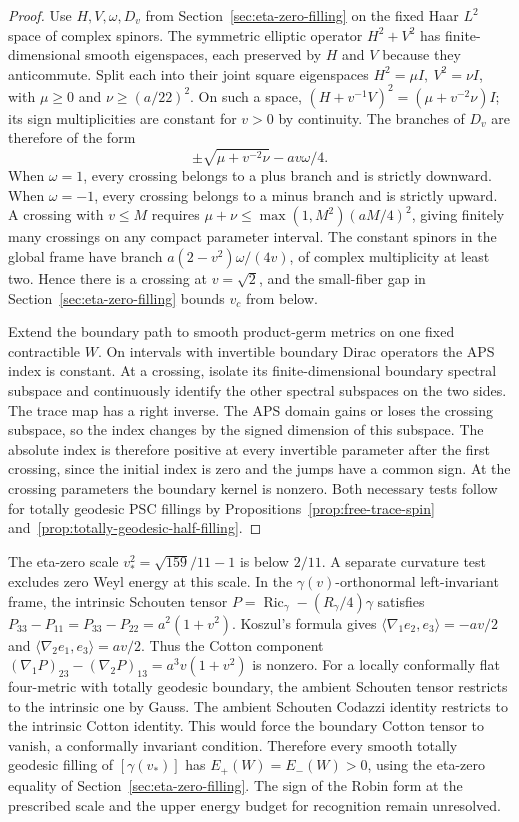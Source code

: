 \begin{proof}
Use \(H,V,\omega,D_v\) from Section~\ref{sec:eta-zero-filling}
on the fixed Haar \(L^2\) space of complex spinors. The symmetric
elliptic operator \(H^2+V^2\) has finite-dimensional smooth
eigenspaces, each preserved by \(H\) and \(V\) because they
anticommute. Split each into their joint square eigenspaces
\(H^2=\mu I,\ V^2=\nu I\), with \(\mu\ge0\) and
\(\nu\ge(a/22)^2\). On such a space,
\((H+v^{-1}V)^2=(\mu+v^{-2}\nu)I\); its sign multiplicities are
constant for \(v>0\) by continuity. The branches of \(D_v\)
are therefore of the form
\[
  \pm\sqrt{\mu+v^{-2}\nu}-av\omega/4 .
\]
When \(\omega=1\), every crossing belongs to a plus branch
and is strictly downward. When \(\omega=-1\), every crossing
belongs to a minus branch and is strictly upward. A crossing
with \(v\le M\) requires
\(\mu+\nu\le\max(1,M^2)(aM/4)^2\), giving finitely many
crossings on any compact parameter interval. The constant
spinors in the global frame have branch
\(a(2-v^2)\omega/(4v)\), of complex multiplicity at least two.
Hence there is a crossing at \(v=\sqrt2\), and the small-fiber
gap in Section~\ref{sec:eta-zero-filling} bounds \(v_c\) from
below.

Extend the boundary path to smooth product-germ metrics on one
fixed contractible \(W\). On intervals with invertible boundary
Dirac operators the APS index is constant. At a crossing,
isolate its finite-dimensional boundary spectral subspace
and continuously identify the other spectral subspaces on
the two sides. The trace map has a right inverse. The APS
domain gains or loses the crossing subspace, so the index
changes by the signed dimension of this subspace. The
absolute index is therefore positive at every invertible
parameter after the first crossing, since the initial index
is zero and the jumps have a common sign. At the crossing
parameters the boundary kernel is nonzero. Both necessary
tests follow for totally geodesic PSC fillings by
Propositions~\ref{prop:free-trace-spin}
and~\ref{prop:totally-geodesic-half-filling}.
\end{proof}

The eta-zero scale \(v_*^2=\sqrt{159}/11-1\) is below
\(2/11\). A separate curvature test excludes zero Weyl
energy at this scale. In the \(\gamma(v)\)-orthonormal
left-invariant frame, the intrinsic Schouten tensor
\(P=\operatorname{Ric}_\gamma-(R_\gamma/4)\gamma\) satisfies
\(P_{33}-P_{11}=P_{33}-P_{22}=a^2(1+v^2)\).
Koszul's formula gives
\(\langle\nabla_1 e_2,e_3\rangle=-av/2\) and
\(\langle\nabla_2 e_1,e_3\rangle=av/2\). Thus the Cotton
component \((\nabla_1P)_{23}-(\nabla_2P)_{13}
=a^3v(1+v^2)\) is nonzero. For a locally conformally flat
four-metric with totally geodesic boundary, the ambient
Schouten tensor restricts to the intrinsic one by Gauss.
The ambient Schouten Codazzi identity restricts to the
intrinsic Cotton identity. This would force the boundary
Cotton tensor to vanish, a conformally invariant condition.
Therefore every smooth totally geodesic filling of
\([\gamma(v_*)]\) has \(E_+(W)=E_-(W)>0\), using the
eta-zero equality of Section~\ref{sec:eta-zero-filling}.
The sign of the Robin form at the prescribed scale and
the upper energy budget for recognition remain unresolved.
